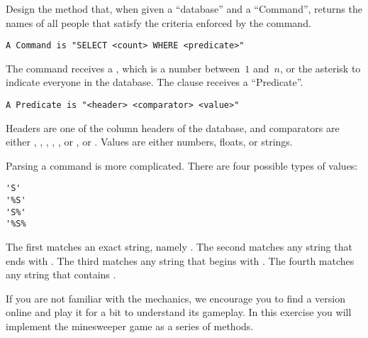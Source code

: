 
Design the  method that, when given a ``database'' and a ``Command'', returns the names of all people that satisfy the criteria enforced by the command.

\begin{verbatim}
A Command is "SELECT <count> WHERE <predicate>"
\end{verbatim}

The  command receives a , which is a number between~$1$ and~$n$, or the asterisk to indicate everyone in the database. The  clause receives a ``Predicate''.

\begin{verbatim}
A Predicate is "<header> <comparator> <value>"
\end{verbatim}

Headers are one of the column headers of the database, and comparators are either \ttt{=}, \ttt{!=}, \ttt{<}, \ttt{<=}, \ttt{>}, or \ttt{>=}, or . Values are either numbers, floats, or strings. 

Parsing a  command is more complicated. There are four possible types of values: 

\begin{verbatim}
'S'
'%S'
'S%'
'%S%
\end{verbatim}

The first matches an exact string, namely . The second matches any string that ends with . The third matches any string that begins with . The fourth matches any string that contains . 

If you are not familiar with the mechanics, we encourage you to find a version online and play it for a bit to understand its gameplay.
In this exercise you will implement the minesweeper game as a series of methods.

